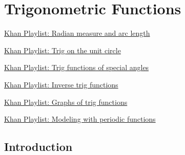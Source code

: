 \section{Trigonometric Functions} \label{S.0.5.TrigFunctions}


\vspace*{-14 pt}


\begin{web}
\item
    \href{https://www.khanacademy.org/math/trigonometry/unit-circle-trig-func/radians_tutorial/v/introduction-to-radians}{Khan
    Playlist: Radian measure and arc length}
\item
    \href{https://www.khanacademy.org/math/trigonometry/unit-circle-trig-func/Trig-unit-circle}{Khan
    Playlist: Trig on the unit circle}
\item
    \href{https://www.khanacademy.org/math/trigonometry/unit-circle-trig-func/trig-functions-special-angles}{Khan
    Playlist: Trig functions of special angles}
\item
    \href{https://www.khanacademy.org/math/trigonometry/unit-circle-trig-func/inverse_trig_functions}{Khan
    Playlist: Inverse trig functions}
\item
    \href{https://www.khanacademy.org/math/trigonometry/trig-function-graphs/trig_graphs_tutorial/v/midline-amplitude-period}{Khan
    Playlist: Graphs of trig functions}
\item
    \href{https://www.khanacademy.org/math/trigonometry/trig-function-graphs/modeling-periodic-functions}{Khan
    Playlist: Modeling with periodic functions}
\end{web}

\nin \hrulefill


\subsection*{Introduction}

